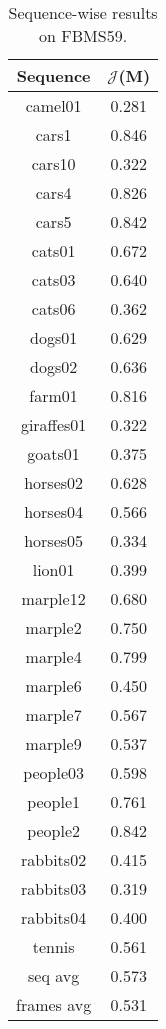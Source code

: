 \begin{table}[!htb]
\centering
\footnotesize
\begin{tabular}{c|c}

Sequence&$\mathcal{J}$(M)\\ \hline
camel01 & 0.281 \\ 
cars1 & 0.846 \\ 
cars10 & 0.322 \\ 
cars4 & 0.826 \\ 
cars5 & 0.842 \\ 
cats01 & 0.672 \\ 
cats03 & 0.640 \\ 
cats06 & 0.362 \\ 
dogs01 & 0.629 \\ 
dogs02 & 0.636 \\ 
farm01 & 0.816 \\ 
giraffes01 & 0.322 \\ 
goats01 & 0.375 \\ 
horses02 & 0.628 \\ 
horses04 & 0.566 \\ 
horses05 & 0.334 \\ 
lion01 & 0.399 \\ 
marple12 & 0.680 \\ 
marple2 & 0.750 \\ 
marple4 & 0.799 \\ 
marple6 & 0.450 \\ 
marple7 & 0.567 \\ 
marple9 & 0.537 \\ 
people03 & 0.598 \\ 
people1 & 0.761 \\ 
people2 & 0.842 \\ 
rabbits02 & 0.415 \\  
rabbits03 & 0.319 \\ 
rabbits04 & 0.400 \\ 
tennis & 0.561 \\ \hline
seq avg & 0.573 \\ 
frames avg & 0.531 \\ 
\end{tabular}
\caption{Sequence-wise results on FBMS59.}
\label{tab:fbms}
\end{table}

\newpage

